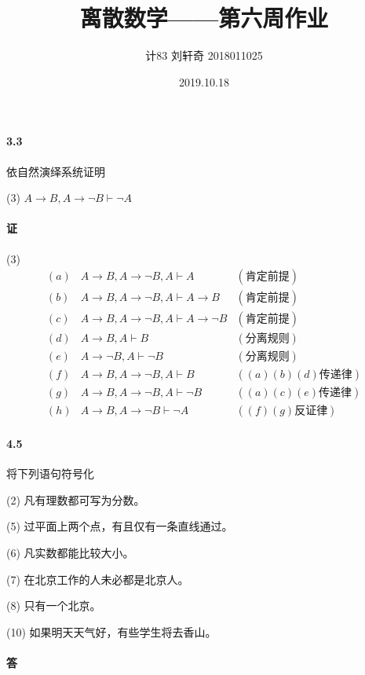 \documentclass[hyperref, UTF8]{ctexart}
\title{离散数学——第六周作业}
\author{计83  刘轩奇  2018011025}
\date{2019.10.18}
\begin{document}
\maketitle

\paragraph{3.3}\label{3.3}
依自然演绎系统证明

(3) $ A \rightarrow B, A \rightarrow \lnot B \vdash \lnot A $

\paragraph{证} (3) 
\begin{align*}
(a) & A \rightarrow B, A \rightarrow \lnot B, A \vdash A & (\text{肯定前提}) \\
(b) & A \rightarrow B, A \rightarrow \lnot B, A \vdash A \rightarrow B & (\text{肯定前提}) \\
(c) & A \rightarrow B, A \rightarrow \lnot B, A \vdash A \rightarrow \lnot B & (\text{肯定前提}) \\
(d) & A \rightarrow B, A \vdash B & (\text{分离规则}) \\
(e) & A \rightarrow \lnot B, A \vdash \lnot B & (\text{分离规则}) \\
(f) & A \rightarrow B, A \rightarrow \lnot B, A \vdash B & ((a)(b)(d)\text{传递律}) \\
(g) & A \rightarrow B, A \rightarrow \lnot B, A \vdash \lnot B & ((a)(c)(e)\text{传递律}) \\
(h) & A \rightarrow B, A \rightarrow \lnot B \vdash \lnot A & ((f)(g)\text{反证律})
\end{align*}

\paragraph{4.5}\label{4.5}
将下列语句符号化

(2) 凡有理数都可写为分数。

(5) 过平面上两个点，有且仅有一条直线通过。

(6) 凡实数都能比较大小。

(7) 在北京工作的人未必都是北京人。

(8) 只有一个北京。

(10) 如果明天天气好，有些学生将去香山。

\paragraph{答}
\end{document}
